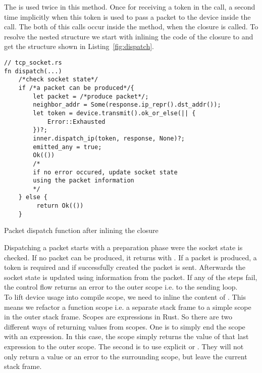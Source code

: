  The \dev{} is used twice in this method. Once for receiving a token in the  call, a second time implicitly when this token is used to pass a packet to the device inside the  call. The both of this calls occur inside the  method, when the  closure is called. To resolve the nested structure we start with inlining the code of the  closure to  and get the structure shown in Listing~\ref{fig:dispatch}. 
 
 \begin{codefigure}[H]
\centering    
\begin{verbatim}
// tcp_socket.rs
fn dispatch(...)
    /*check socket state*/
    if /*a packet can be produced*/{
        let packet = /*produce packet*/;
        neighbor_addr = Some(response.ip_repr().dst_addr());
        let token = device.transmit().ok_or_else(|| {
            Error::Exhausted
        })?;
        inner.dispatch_ip(token, response, None)?;
        emitted_any = true;
        Ok(())
        /* 
        if no error occured, update socket state
        using the packet information        
        */
    } else {
         return Ok(())
    }                    
\end{verbatim}
\caption{Packet dispatch function after inlining the  closure}
\label{fig:dispatch}
\end{codefigure}

Dispatching a packet starts with a preparation phase were the socket state is checked. If no packet can be produced, it returns with . If a packet is produced, a token is required and if successfully created the packet is sent. Afterwards the socket state is updated using information from the packet. If any of the steps fail, the control flow returns an error to the outer scope i.e. to the sending loop. \\

To lift device usage into compile scope, we need to inline the content of . This means we refactor a function scope i.e. a separate stack frame to a simple scope in the outer stack frame. Scopes are expressions in Rust. So there are two different ways of returning values from scopes. One is to simply end the scope with an expression. In this case, the scope simply returns the value of that last expression to the outer scope. The second is to use explicit  or . They will not only return a value or an error to the surrounding scope, but leave the current stack frame. \\

